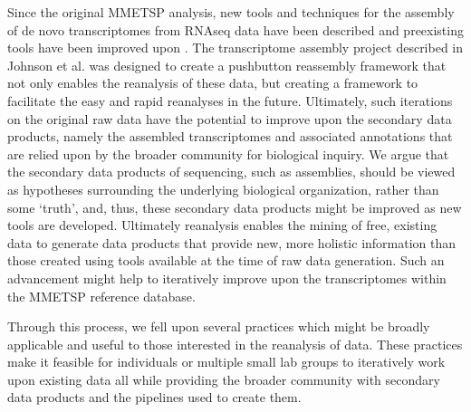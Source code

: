 \documentclass[12pt]{article}
\begin{document}
Since the original MMETSP analysis, new tools and techniques for the assembly of de novo transcriptomes from RNAseq data have been described and preexisting tools have been improved upon \cite{Grabherr2011}. The transcriptome assembly project described in Johnson et al. \cite{Johnson2018} was designed to create a pushbutton reassembly framework that not only enables the reanalysis of these data, but creating a framework to facilitate the easy and rapid reanalyses in the future. Ultimately, such iterations on the original raw data have the potential to improve upon the secondary data products, namely the assembled transcriptomes and associated annotations that are relied upon by the broader community for biological inquiry. We argue that the secondary data products of sequencing, such as assemblies, should be viewed as hypotheses surrounding the underlying biological organization, rather than some `truth', and, thus, these secondary data products might be improved as new tools are developed. Ultimately reanalysis enables the mining of free, existing data to generate data products that provide new, more holistic information than those created using tools available at the time of raw data generation. Such an advancement might help to iteratively improve upon the transcriptomes within the MMETSP reference database.

Through this process, we fell upon several practices which might be broadly applicable and useful to those interested in the reanalysis of data. These practices make it feasible for individuals or multiple small lab groups to iteratively work upon existing data all while providing the broader community with secondary data products and the pipelines used to create them. %

\end{document}
